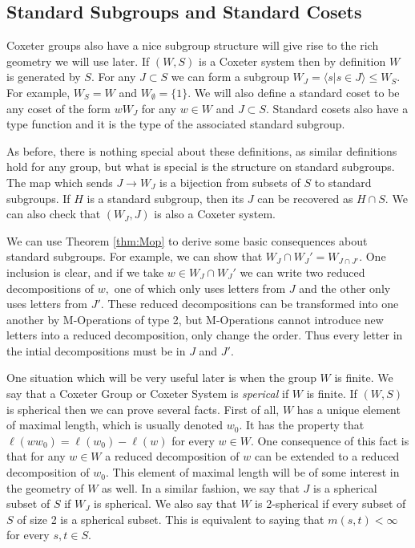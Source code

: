 \documentclass[class=book, crop=false,12 pt]{standalone}
\begin{document}
\subsection{Standard Subgroups and Standard Cosets}
Coxeter groups also have a nice subgroup structure will give rise to the rich geometry we will use later. If $(W,S)$ is a Coxeter system then by definition $W$ is generated by $S.$ For any $J\subset S$ we can form a subgroup $W_J=\langle s|s\in J\rangle\le W_S.$ For example, $W_S=W$ and $W_{\emptyset}=\{1\}.$ We will also define a standard coset to be any coset of the form $wW_J$ for any $w\in W$ and $J\subset S.$ Standard cosets also have a type function and it is the type of the associated standard subgroup.

As before, there is nothing special about these definitions, as similar definitions hold for any group, but what is special is the structure on standard subgroups. The map which sends $J\to W_J$ is a bijection from subsets of $S$ to standard subgroups. If $H$ is a standard subgroup, then its $J$ can be recovered as $H\cap S.$ We can also check that $(W_J,J)$ is also a Coxeter system.

We can use Theorem \ref{thm:Mop} to derive some basic consequences about standard subgroups. For example, we can show that $W_J\cap W_J'=W_{J\cap J'}.$ One inclusion is clear, and if we take $w\in W_J\cap W_J'$ we can write two reduced decompositions of $w,$ one of which only uses letters from $J$ and the other only uses letters from $J'.$ These reduced decompositions can be transformed into one another by M-Operations of type 2, but M-Operations cannot introduce new letters into a reduced decomposition, only change the order. Thus every letter in the intial decompositions must be in $J$ and $J'.$

One situation which will be very useful later is when the group $W$ is finite. We say that a Coxeter Group or Coxeter System is \emph{sperical} if $W$ is finite. If $(W,S)$ is spherical then we can prove several facts. First of all, $W$ has a unique element of maximal length, which is usually denoted $w_0.$ It has the property that $\ell(ww_0)=\ell(w_0)-\ell(w)$ for every $w\in W.$ One consequence of this fact is that for any $w\in W$ a reduced decomposition of $w$ can be extended to a reduced decomposition of $w_0.$ This element of maximal length will be of some interest in the geometry of $W$ as well. In a similar fashion, we say that $J$ is a spherical subset of $S$ if $W_J$ is spherical. We also say that $W$ is 2-spherical if every subset of $S$ of size 2 is a spherical subset. This is equivalent to saying that $m(s,t)<\infty$ for every $s,t\in S.$
\end{document}
